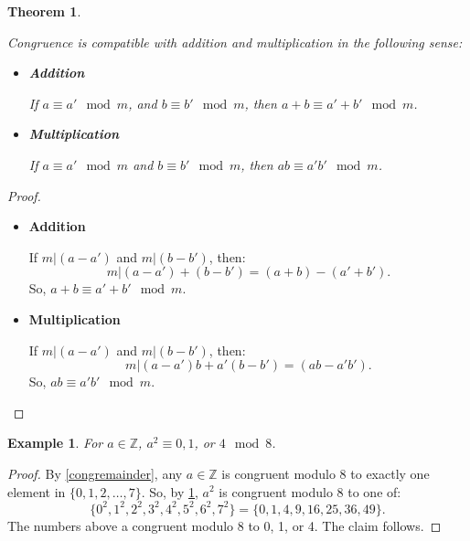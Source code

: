 \documentclass[a4paper,12pt]{report}
\newcounter{statement}
\numberwithin{statement}{chapter}
\newtheorem{thm}[statement]{Theorem}
\newtheorem{eg}[statement]{\bf Example}
\numberwithin{equation}{chapter}
\numberwithin{section}{chapter}
\numberwithin{subsection}{section}
\begin{document}
\begin{thm}
\label{congcompat}


Congruence is compatible with addition and multiplication in the following sense:
\begin{itemize}
\item 

 {\bf Addition} 


If $a \equiv a' \mod m$, and $b \equiv b' \mod m$, then $a + b \equiv a'+ b'\mod m$.


\item 

 {\bf Multiplication} 


If $a \equiv a' \mod m$ and $b \equiv b' \mod m$, then
$ab \equiv a'b' \mod m$.

\end{itemize}
\end{thm}
\begin{proof}

\begin{itemize}
\item 

 {\bf Addition} 


If $m | (a - a')$ and $m | (b - b')$, then:
\[
m | (a - a') + (b - b') = (a + b) - (a' + b').
\]
So, $a + b \equiv a' + b' \mod m$.


\item 

 {\bf Multiplication} 


If $m | (a - a')$ and $m | (b - b')$, then:
\[
m | (a - a')b + a'(b - b') = (ab - a'b').
\]
So, $ab \equiv a'b' \mod m$.

\end{itemize}


\end{proof}

\begin{eg}
For $a \in \mathbb{Z}$, $a^2 \equiv 0, 1$, or $4 \mod 8$.
\end{eg}
\begin{proof}

By
\cref{congremainder},
any $a \in \mathbb{Z}$ is congruent modulo $8$ to exactly one
element in $\{0, 1, 2, \ldots, 7\}$.
So, by
\cref{congcompat},
$a^2$ is congruent modulo 8 to one of:
\[
\{0^2, 1^2, 2^2, 3^2, 4^2, 5^2, 6^2, 7^2\} = \{0, 1, 4, 9, 16, 25, 36, 49\}.
\]
The numbers above a congruent modulo 8 to 0, 1, or 4. The claim follows.


\end{proof}
\end{document}
